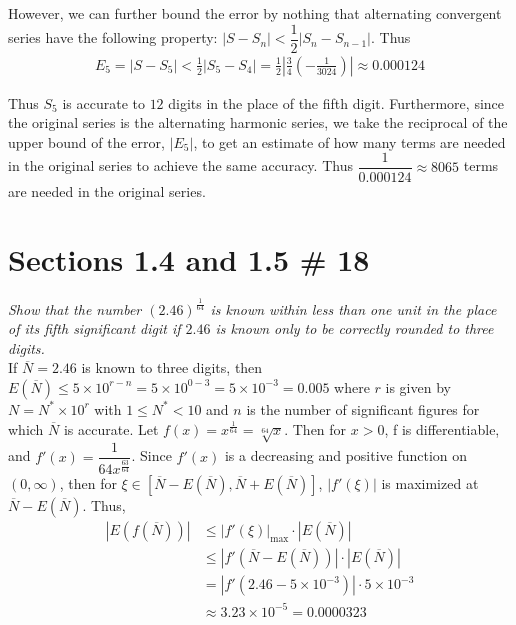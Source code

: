 \documentclass[12pt]{article}
\begin{document}
\noindent However, we can further bound the error by nothing that alternating convergent series have the following property: $|S - S_n| < \dfrac{1}{2}|S_n - S_{n-1}|$.  Thus
\begin{align*}
E_5 = |S - S_5| < \frac{1}{2}|S_5 - S_4| = \frac{1}{2}\left|\frac{3}{4}\left(-\frac{1}{3024}\right)\right| \approx 0.000124
\end{align*}

\noindent Thus $S_5$ is accurate to $12$ digits in the place of the fifth digit.  Furthermore, since the original series is the alternating harmonic series, we take the reciprocal of the upper bound of the error, $|E_5|$, to get an estimate of how many terms are needed in the original series to achieve the same accuracy.  Thus $\dfrac{1}{0.000124} \approx 8065$ terms are needed in the original series.

\pagebreak
\section*{Sections 1.4 and 1.5 \# 18}
{\it Show that the number $(2.46)^{\frac{1}{64}}$ is known within less than one unit in the place of its \rm fifth \it significant digit if $2.46$ is known only to be correctly rounded to three digits.} \\

\noindent If $\overline{N} = 2.46$ is known to three digits, then $E(\overline{N}) \leq 5 \times 10^{r - n} = 5 \times 10^{0 - 3} = 5 \times 10^{-3} = 0.005$ where $r$ is given by $N = N^*\times 10^r$ with $1\leq N^* < 10$ and $n$ is the number of significant figures for which $\overline{N}$ is accurate.  Let $f(x) = x^{\frac{1}{64}}= \sqrt[64]{x}$.  Then for $x > 0$, f is differentiable, and $f'(x) = \dfrac{1}{64x^{\frac{63}{64}}}$.  Since $f'(x)$ is a decreasing and positive function on $(0, \infty)$, then for $\xi \in [\overline{N} - E(\overline{N}), \overline{N} + E(\overline{N})]$, $|f'(\xi)|$ is maximized at $\overline{N} - E(\overline{N})$. Thus,
\begin{align*}
|E(f(\overline{N}))| &\leq |f'(\xi)|_{\text{max}}\cdot |E(\overline{N})| \\
&\leq |f'(\overline{N} - E(\overline{N}))| \cdot |E(\overline{N})| \\
&= |f'(2.46 - 5\times10^{-3})| \cdot 5 \times 10^{-3} \\
&\approx 3.23\times 10^{-5} = 0.0000323
\end{align*}
\end{document}
